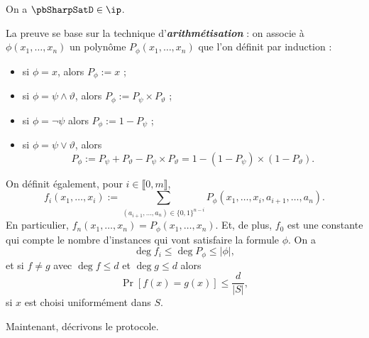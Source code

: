 \documentclass[./main]{subfiles}
\begin{document}
  \begin{thm}
    On a $\pbSharpSatD \in \ip$.
  \end{thm}
  \begin{prv}
    La preuve se base sur la technique d'\textit{\textbf{arithmétisation}} : on
    associe à $\phi(x_1, \ldots, x_n)$ un polynôme $P_\phi(x_1, \ldots, x_n)$
    que l'on définit par induction :
    \begin{itemize}
      \item si $\phi = x$, alors $P_\phi := x$ ;
      \item si $\phi = \psi \wedge \vartheta$, alors $P_\phi := P_\psi \times P_\vartheta$ ;
      \item si $\phi = \lnot \psi$ alors  $P_\phi := 1 - P_\psi$ ;
      \item si $\phi = \psi \vee \vartheta$, alors
        \[
          P_\phi := P_\psi + P_\vartheta - P_\psi \times P_\vartheta = 1 - (1 - P_\psi) \times (1 - P_\vartheta)
        .\]
    \end{itemize}
    On définit également, pour $i \in \llbracket 0, m\rrbracket$,
    \[
    f_i(x_1, \ldots, x_i) := \sum_{(a_{i+1}, \ldots, a_n) \in \{0, 1\}^{n - i}} P_\phi(x_1, \ldots, x_i, a_{i+1}, \ldots, a_n)
    .\]
    En particulier,  $f_n(x_1, \ldots, x_n) = P_\phi(x_1, \ldots, x_n)$.
    Et, de plus, $f_0$ est une constante qui compte le nombre d'instances qui
    vont satisfaire la formule $\phi$. On a \[
    \deg f_i \le \deg P_\phi \le |\phi|
    ,\] et si $f \neq g$ avec $\deg f \le d$ et $\deg g \le d$ alors
    \begin{equation}
      \label{prv:sharpsat-in-ip-neq-poly}
      \tag{$*$}
      \Pr[f(x) = g(x)] \le \frac{d}{|S|}
    ,\end{equation}
    si $x$ est choisi uniformément dans $S$.

    Maintenant, décrivons le protocole.


\end{prv}
\end{document}
